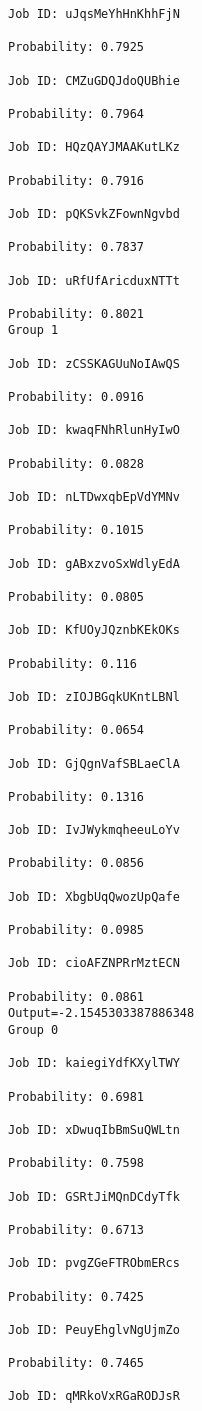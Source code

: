 \documentclass[11pt]{article}
\begin{document}
\begin{Verbatim}[commandchars=\\\{\}]
Job ID: uJqsMeYhHnKhhFjN

Probability: 0.7925

Job ID: CMZuGDQJdoQUBhie

Probability: 0.7964

Job ID: HQzQAYJMAAKutLKz

Probability: 0.7916

Job ID: pQKSvkZFownNgvbd

Probability: 0.7837

Job ID: uRfUfAricduxNTTt

Probability: 0.8021
Group 1

Job ID: zCSSKAGUuNoIAwQS

Probability: 0.0916

Job ID: kwaqFNhRlunHyIwO

Probability: 0.0828

Job ID: nLTDwxqbEpVdYMNv

Probability: 0.1015

Job ID: gABxzvoSxWdlyEdA

Probability: 0.0805

Job ID: KfUOyJQznbKEkOKs

Probability: 0.116

Job ID: zIOJBGqkUKntLBNl

Probability: 0.0654

Job ID: GjQgnVafSBLaeClA

Probability: 0.1316

Job ID: IvJWykmqheeuLoYv

Probability: 0.0856

Job ID: XbgbUqQwozUpQafe

Probability: 0.0985

Job ID: cioAFZNPRrMztECN

Probability: 0.0861
Output=-2.1545303387886348
Group 0

Job ID: kaiegiYdfKXylTWY

Probability: 0.6981

Job ID: xDwuqIbBmSuQWLtn

Probability: 0.7598

Job ID: GSRtJiMQnDCdyTfk

Probability: 0.6713

Job ID: pvgZGeFTRObmERcs

Probability: 0.7425

Job ID: PeuyEhglvNgUjmZo

Probability: 0.7465

Job ID: qMRkoVxRGaRODJsR


\end{Verbatim}
\end{document}
